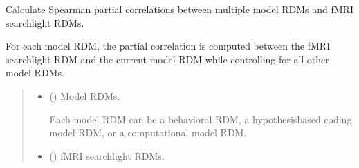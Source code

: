 \documentclass[letterpaper,10pt,english]{sphinxhowto}
\begin{document}

\begin{fulllineitems}
\label{\detokenize{corr_cal_by_rdm:neurora.corr_cal_by_rdm.fmrirdms_partialcorr}}
\pysigstartsignatures
{}
\pysigstopsignatures
\sphinxAtStartPar
Calculate Spearman partial correlations between multiple model RDMs and fMRI searchlight RDMs.

\sphinxAtStartPar
For each model RDM, the partial correlation is computed between the
fMRI searchlight RDM and the current model RDM while controlling for
all other model RDMs.
\begin{quote}\begin{description}
\begin{itemize}
\item {} 
\sphinxAtStartPar
{} (\sphinxstyleliteralemphasis{\sphinxupquote{, }}\sphinxstyleliteralemphasis{\sphinxupquote{ {[}}}\sphinxstyleliteralemphasis{\sphinxupquote{, }}\sphinxstyleliteralemphasis{\sphinxupquote{, }}\sphinxstyleliteralemphasis{\sphinxupquote{{]}}}) \textendash{} 
\sphinxAtStartPar
Model RDMs.

\sphinxAtStartPar
Each model RDM can be a behavioral RDM, a hypothesis\sphinxhyphen{}based coding
model RDM, or a computational model RDM.


\item {} 
\sphinxAtStartPar
{} (\sphinxstyleliteralemphasis{\sphinxupquote{, }}\sphinxstyleliteralemphasis{\sphinxupquote{ {[}}}\sphinxstyleliteralemphasis{\sphinxupquote{, }}\sphinxstyleliteralemphasis{\sphinxupquote{, }}\sphinxstyleliteralemphasis{\sphinxupquote{, }}\sphinxstyleliteralemphasis{\sphinxupquote{, }}\sphinxstyleliteralemphasis{\sphinxupquote{{]}}}) \textendash{} 
\sphinxAtStartPar
fMRI searchlight RDMs.


\end{itemize}
\end{description}
\end{quote}
\end{fulllineitems}
\end{document}
